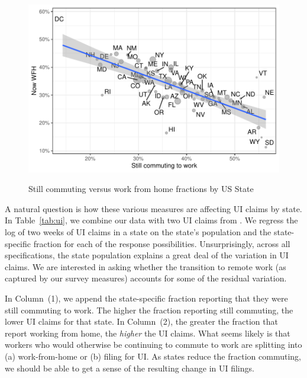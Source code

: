 \documentclass[12pt]{article}
\begin{document}
\begin{figure}
  \caption{Still commuting versus work from home fractions by US State} \label{fig:commute_vs_wfh}
\centering
\begin{minipage}{0.8 \linewidth}
  \includegraphics[width = \linewidth]{plots/commute_vs_wfh.pdf} \\
  \begin{footnotesize}
    \end{footnotesize}
\end{minipage}
\end{figure} 

A natural question is how these various measures are affecting UI claims by state. 
In Table~\ref{tab:ui}, we combine our data with two  UI claims from \cite{goldsmith2020}.
We regress the log of two weeks of UI claims in a state on the state's population and the state-specific fraction for each of the response possibilities.  
Unsurprisingly, across all specifications, the state population explains a great deal of the variation in UI claims.
We are interested in asking whether the transition to remote work (as captured by our survey measures) accounts for some of the residual variation.



In Column~(1), we append the state-specific fraction reporting that they were still commuting to work.
The higher the fraction reporting still commuting, the lower UI claims for that state.
In Column~(2), the greater the fraction that report working from home, the \emph{higher} the UI claims.
What seems likely is that workers who would otherwise be continuing to commute to work are splitting into (a) work-from-home or (b) filing for UI.
As states reduce the fraction commuting, we should be able to get a sense of the resulting change in UI filings. 
\end{document}
